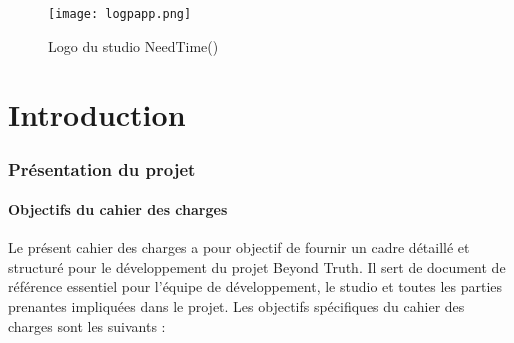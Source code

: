 \documentclass[
	article,			%
	11pt,				%
	oneside,			%
	a4paper,			%
	chapter=TITLE,
	french,			%
	sumario=tradicional
	]{base_nt}
\begin{document}
\vspace{10cm}
\begin{figure}[ht]
	\caption{Logo du studio NeedTime()}
	\centering
	\texttt{[image: logpapp.png]}
	
\end{figure}

\textual

\newpage

\customtableofcontents

\newpage

\part{Introduction}
\section{Présentation du projet}

\subsection{Objectifs du cahier des charges}

Le présent cahier des charges a pour objectif de fournir un cadre détaillé et structuré pour le développement du projet Beyond Truth. Il sert de document de référence essentiel pour l'équipe de développement, le studio et toutes les parties prenantes impliquées dans le projet. Les objectifs spécifiques du cahier des charges sont les suivants :
\end{document}
